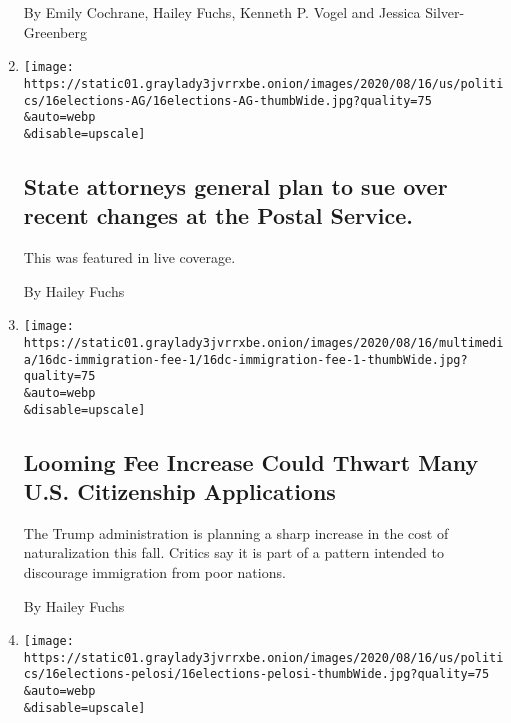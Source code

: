 \begin{enumerate}
  By Emily Cochrane, Hailey Fuchs, Kenneth P. Vogel and Jessica
  Silver-Greenberg
\item
  \href{/live/2020/08/16/us/election-trump-vs-biden/state-attorneys-general-plan-to-sue-over-recent-changes-at-the-postal-service}{}

  \texttt{[image: https://static01.graylady3jvrrxbe.onion/images/2020/08/16/us/politics/16elections-AG/16elections-AG-thumbWide.jpg?quality=75\\\&auto=webp\\\&disable=upscale]}

  \hypertarget{state-attorneys-general-plan-to-sue-over-recent-changes-at-the-postal-service}{%
  \subsection{State attorneys general plan to sue over recent changes at
  the Postal
  Service.}\label{state-attorneys-general-plan-to-sue-over-recent-changes-at-the-postal-service}}

  This was featured in live coverage.

  By Hailey Fuchs
\item
  \href{/2020/08/16/us/politics/us-citizenship-fee-increase.html}{}

  \texttt{[image: https://static01.graylady3jvrrxbe.onion/images/2020/08/16/multimedia/16dc-immigration-fee-1/16dc-immigration-fee-1-thumbWide.jpg?quality=75\\\&auto=webp\\\&disable=upscale]}

  \hypertarget{looming-fee-increase-could-thwart-many-us-citizenship-applications}{%
  \subsection{Looming Fee Increase Could Thwart Many U.S. Citizenship
  Applications}\label{looming-fee-increase-could-thwart-many-us-citizenship-applications}}

  The Trump administration is planning a sharp increase in the cost of
  naturalization this fall. Critics say it is part of a pattern intended
  to discourage immigration from poor nations.

  By Hailey Fuchs
\item
  \href{/live/2020/08/16/us/election-trump-vs-biden/as-concerns-about-mail-in-ballots-mount-pelosi-will-reconvene-the-house-early-to-vote}{}

  \texttt{[image: https://static01.graylady3jvrrxbe.onion/images/2020/08/16/us/politics/16elections-pelosi/16elections-pelosi-thumbWide.jpg?quality=75\\\&auto=webp\\\&disable=upscale]}


\end{enumerate}
